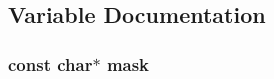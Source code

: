 \subsection{Variable Documentation}
\subsubsection[{\texorpdfstring{mask}{mask}}]{\setlength{\rightskip}{0pt plus 5cm}const char$\ast$ mask}\hypertarget{group__APR__Util__Date_ga6bd7250007a3cfeadacf370fbf68cf5a}{}\label{group__APR__Util__Date_ga6bd7250007a3cfeadacf370fbf68cf5a}
